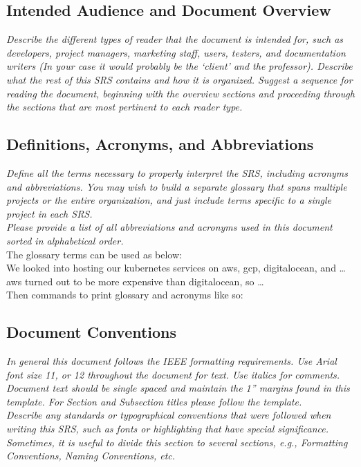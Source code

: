 \documentclass[12pt]{article}
\newcommand{\gnl}{\vspace{1em}\\}      %
\begin{document}
    \subsection{Intended Audience and Document Overview}
        \emph{Describe the different types of reader that the document is intended for, such as developers, project managers, marketing staff, users, testers, and documentation writers (In your case it would probably be the `client' and the professor). Describe what the rest of this SRS contains and how it is organized. Suggest a sequence for reading the document, beginning with the overview sections and proceeding through the sections that are most pertinent to each reader type.}
    \subsection{Definitions, Acronyms, and Abbreviations}
        \emph{Define all the terms necessary to properly interpret the SRS, including acronyms and abbreviations. You may wish to build a separate glossary that spans multiple projects or the entire organization, and just include terms specific to a single project in each SRS.\gnl Please provide a list of all abbreviations and acronyms used in this document sorted in alphabetical order.}
        \gnl The glossary terms can be used as below:
        \\\hspace*{10mm} We looked into hosting our \gls{kubernetes} services on \gls{aws}, \gls{gcp}, \gls{digitalocean}, and \dots \Gls{aws} turned out to be more expensive than \gls{digitalocean}, so \dots
        \\ Then commands to print glossary and acronyms like so: 
        \printnoidxglossary
        \printnoidxglossary[type=acronym]
        \printacronyms
    \subsection{Document Conventions}
        \emph{In general this document follows the IEEE formatting requirements. Use Arial font size 11, or 12 throughout the document for text. Use italics for comments. Document text should be single spaced and maintain the 1” margins found in this template. For Section and Subsection titles please follow the template.\gnl Describe any standards or typographical conventions that were followed when writing this SRS, such as fonts or highlighting that have special significance. Sometimes, it is useful to divide this section to several sections, e.g., Formatting Conventions, Naming Conventions, etc.}
\end{document}
